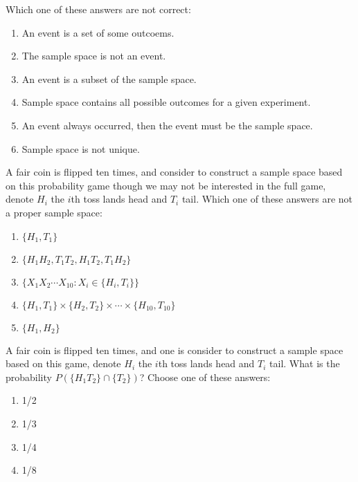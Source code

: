 \documentclass[poll_tutorial_format]{subfiles}
\begin{document}
	\begin{exercise}
	Which one of these answers are not correct: %
	\begin{enumerate}
		\item An event is a set of some outcoems.
		\item The sample space is not an event.
		\item An event is a subset of the sample space.
		\item Sample space contains all possible outcomes for a given experiment.
		\item An event always occurred, then the event must be the sample space.
		\item Sample space is not unique.
	\end{enumerate}
\end{exercise}

	
	\begin{exercise}
		A fair coin is flipped ten times, and  consider to construct a sample space based on this probability game though we may not be interested in the full game, denote $H_i$ the $i$th toss lands head and $T_i$ tail. 
		Which one of these answers are not a proper sample space:%
		\begin{enumerate}
			\item $\{H_1, T_1\}$
			\item $\{H_1H_2, T_1T_2, H_1T_2, T_1H_2\}$
			\item $\{X_1X_2\cdots X_{10}: X_i \in \{H_i,T_i\}\}$
			\item $\{H_1, T_1\}\times\{H_2, T_2\}\times  \cdots \times \{H_{10}, T_{10}\}$
			\item $\{H_1, H_2\}$
		\end{enumerate}
	\end{exercise}
	
	\begin{exercise}
		A fair coin is flipped ten times, and one is consider to construct a sample space based on this game, denote $H_i$ the $i$th toss lands head and $T_i$ tail. What is the probability $P( \{H_1T_2\} \cap \{T_2\} )$?
		Choose one of these answers:%
		\begin{enumerate}
			\item 1/2
			\item 1/3
			\item 1/4
			\item 1/8
		\end{enumerate}
	\end{exercise}
\end{document}
